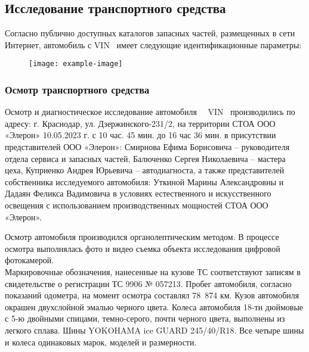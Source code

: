 \vspace{3mm}

% 
\subsection{Исследование транспортного средства}

Согласно публично доступных  каталогов запасных частей, размещенных в сети Интернет,  автомобиль с VIN \vin \ имеет следующие идентификационные параметры:
\begin{figure}[H]
	\centering
	\texttt{[image: example-image]}
\end{figure}


\subsubsection{Осмотр транспортного средства}

Осмотр и диагностическое исследование  автомобиля  \, \, VIN \vin \, производились по адресу: г. Краснодар, ул. Дзержинского-231/2, на территории СТОА ООО «Элерон» 10.05.2023 г. с 10 час. 45 мин. до 16 час 36 мин.   в присутствии представителей ООО «Элерон»: Смирнова Ефима Борисовича – руководителя отдела сервиса и запасных частей, Балюченко Сергея Николаевича – мастера цеха, Куприенко Андрея Юрьевича – автодиагноста, а также представителей собственника исследуемого автомобиля: Уткиной Марины Александровны и Дадаян Феликса Вадимовича в условиях естественного и искусственного освещения с использованием производственных мощностей СТОА ООО «Элерон».

Осмотр автомобиля производился  органолептическим методом. В процессе осмотра выполнялась фото и видео съемка объекта исследования цифровой фотокамерой.\\ 
Маркировочные обозначения, нанесенные на кузове ТС соответствуют записям  в свидетельстве о регистрации ТС  9906 № 057213. Пробег автомобиля, согласно показаний одометра, на момент осмотра составлял 78~874 км.   Кузов автомобиля окрашен двухслойной эмалью черного цвета. Колеса автомобиля 18-ти дюймовые с 5-ю двойными спицами, темно-серого, почти черного цвета,  выполнены из легкого сплава. Шины YOKOHAMA ice GUARD 245/40/R18. Все четыре шины и колеса одинаковых марок, моделей и размерности.

